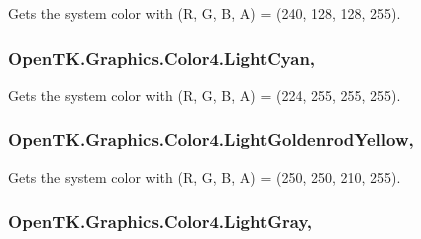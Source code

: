 Gets the system color with (R, G, B, A) = (240, 128, 128, 255). 

\hypertarget{struct_open_t_k_1_1_graphics_1_1_color4_a03338920bc9c62cf4de8ae9d30aa20bf}{
\subsubsection[{Light\-Cyan}]{ Open\-T\-K.\-Graphics.\-Color4.\-Light\-Cyan\hspace{0.3cm}{\ttfamily [static]}, {\ttfamily [get]}}}\label{struct_open_t_k_1_1_graphics_1_1_color4_a03338920bc9c62cf4de8ae9d30aa20bf}


Gets the system color with (R, G, B, A) = (224, 255, 255, 255). 

\hypertarget{struct_open_t_k_1_1_graphics_1_1_color4_a882b74746f33c19061ecc7ed2a433362}{
\subsubsection[{Light\-Goldenrod\-Yellow}]{ Open\-T\-K.\-Graphics.\-Color4.\-Light\-Goldenrod\-Yellow\hspace{0.3cm}{\ttfamily [static]}, {\ttfamily [get]}}}\label{struct_open_t_k_1_1_graphics_1_1_color4_a882b74746f33c19061ecc7ed2a433362}


Gets the system color with (R, G, B, A) = (250, 250, 210, 255). 

\hypertarget{struct_open_t_k_1_1_graphics_1_1_color4_a6bc33cff75dbed4d40a4ce28caa85c4b}{
\subsubsection[{Light\-Gray}]{ Open\-T\-K.\-Graphics.\-Color4.\-Light\-Gray\hspace{0.3cm}{\ttfamily [static]}, {\ttfamily [get]}}}\label{struct_open_t_k_1_1_graphics_1_1_color4_a6bc33cff75dbed4d40a4ce28caa85c4b}


